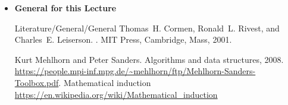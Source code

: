 \documentclass{beamer}
\newcommand\eatdot[1]{}
\begin{document}
\begin{frame}{\LectureFurtherLiterature}
  \small
  \begin{itemize}
  \item       \textbf{General for this Lecture}
      \begin{btSect}{Literature/General/General}
         Thomas~H. Cormen, Ronald~L. Rivest, and Charles~E. Leiserson.
         .
         \newblock MIT Press, Cambridge, Mass, 2001.
         
         Kurt Mehlhorn and Peter Sanders.
         \newblock Algorithms and data structures, 2008.
         \newblock
         \url{https://people.mpi-inf.mpg.de/~mehlhorn/ftp/Mehlhorn-Sanders-Toolbox.pdf}.
         Mathematical induction\eatdot.
         \newblock \url{https://en.wikipedia.org/wiki/Mathematical_induction}\eatdot.

      \end{btSect}
  \end{itemize}
\end{frame}

\end{document}
